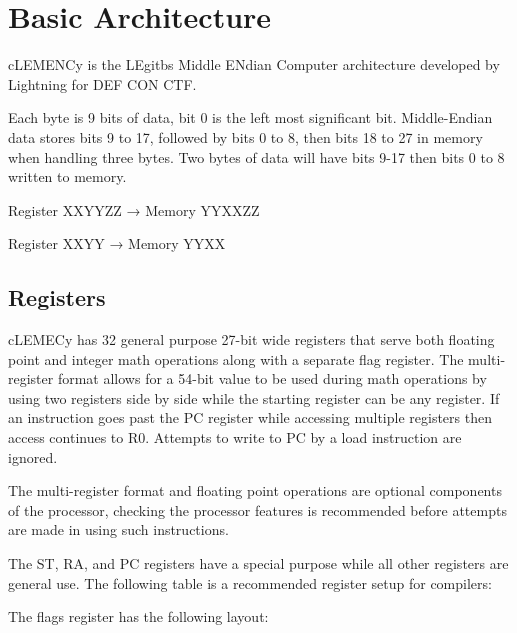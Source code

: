 \chapter{Basic Architecture}

cLEMENCy is the LEgitbs Middle ENdian Computer architecture developed by Lightning for DEF CON CTF.




Each byte is 9 bits of data, bit 0 is the left most significant bit. Middle-Endian data stores bits 9 to 17, followed by bits 0 to 8, then bits 18 to 27 in memory when handling three bytes. Two bytes of data will have bits 9-17 then bits 0 to 8 written to memory.




Register XXYYZZ → Memory YYXXZZ




Register XXYY → Memory YYXX




\section{Registers}

cLEMECy has 32 general purpose 27-bit wide registers that serve both floating point and integer math operations along with a separate flag register. The multi-register format allows for a 54-bit value to be used during math operations by using two registers side by side while the starting register can be any register. If an instruction goes past the PC register while accessing multiple registers then access continues to R0. Attempts to write to PC by a load instruction are ignored.




The multi-register format and floating point operations are optional components of the processor, checking the processor features is recommended before attempts are made in using such instructions.




The ST, RA, and PC registers have a special purpose while all other registers are general use. The following table is a recommended register setup for compilers:








The flags register has the following layout:






